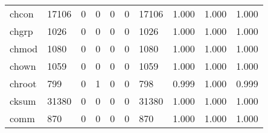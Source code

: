 \begin{longtable}{lp{2.0cm}p{2.0cm}p{2.0cm}p{2.0cm}p{2.0cm}p{2.0cm}p{2.0cm}p{2.0cm}p{2.0cm}}
chcon     &                  17106 &                                  0 &                                 0 &                                0 &                                 0 &                           17106 &                                1.000 &                                  1.000 &                                1.000 \\
chgrp     &                   1026 &                                  0 &                                 0 &                                0 &                                 0 &                            1026 &                                1.000 &                                  1.000 &                                1.000 \\
chmod     &                   1080 &                                  0 &                                 0 &                                0 &                                 0 &                            1080 &                                1.000 &                                  1.000 &                                1.000 \\
chown     &                   1059 &                                  0 &                                 0 &                                0 &                                 0 &                            1059 &                                1.000 &                                  1.000 &                                1.000 \\
chroot    &                    799 &                                  0 &                                 1 &                                0 &                                 0 &                             798 &                                0.999 &                                  1.000 &                                0.999 \\
cksum     &                  31380 &                                  0 &                                 0 &                                0 &                                 0 &                           31380 &                                1.000 &                                  1.000 &                                1.000 \\
comm      &                    870 &                                  0 &                                 0 &                                0 &                                 0 &                             870 &                                1.000 &                                  1.000 &                                1.000 \\

\end{longtable}
